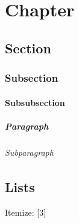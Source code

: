 \documentclass[italian,counters by chapter]{uniud}
\begin{document}

\frontmatter

\maketitle

\tableofcontents*


\mainmatter

\chapter{Chapter}
\blindmathtrue

\blindtext

\section{Section}

\blindtext

\subsection{Subsection}

\blindtext

\subsubsection{Subsubsection}

\blindtext

\paragraph{Paragraph}

\blindtext

\subparagraph{Subparagraph}

\blindtext

\section{Lists}

\blindtext[1]
Itemize:
[3]
\end{document}
